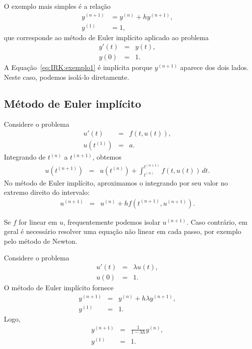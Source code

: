 O exemplo mais simples é a relação
\begin{equation}\label{eq:IRK:exemplo1}
  \begin{split}
    y^{(n+1)}&=y^{(n)}+h y^{(n+1)},\\
    y^{(1)}&=1,
  \end{split}
\end{equation}
que corresponde ao método de Euler implícito aplicado ao problema
\begin{eqnarray}
 y'(t)&=&y(t),\\
 y(0)&=&1.
\end{eqnarray}
A Equação~\eqref{eq:IRK:exemplo1} é implícita porque $y^{(n+1)}$ aparece dos dois lados. Neste caso, podemos isolá-lo diretamente.

\subsection{Método de Euler implícito}\label{sec:euler_imp}
Considere o problema
\begin{eqnarray}
  u'(t)  &=& f(t,u(t)),\\
  u(t^{(1)}) &=& a.
\end{eqnarray}
Integrando de $t^{(n)}$ a $t^{(n+1)}$, obtemos
\begin{eqnarray}
u(t^{(n+1)})&=&u(t^{(n)})+\int_{t^{(n)}}^{t^{(n+1)}}f(t,u(t))\,dt.
\end{eqnarray}
No método de Euler implícito, aproximamos o integrando por seu valor no extremo direito do intervalo:
\begin{eqnarray}
u^{(n+1)}&=&u^{(n)}+h f(t^{(n+1)},u^{(n+1)}).
\end{eqnarray}

Se $f$ for linear em $u$, frequentemente podemos isolar $u^{(n+1)}$. Caso contrário, em geral é necessário resolver uma equação não linear em cada passo, por exemplo pelo método de Newton.

\begin{ex}
Considere o problema
\begin{eqnarray}
u'(t)&=&\lambda u(t),\\
u(0)&=&1.
\end{eqnarray}
O método de Euler implícito fornece
\begin{eqnarray}
 y^{(n+1)}&=&y^{(n)}+h\lambda y^{(n+1)},\\
 y^{(1)}&=&1.
\end{eqnarray}
Logo,
\begin{eqnarray}
 y^{(n+1)}&=&\frac{1}{1-\lambda h}y^{(n)},\\
 y^{(1)}&=&1.
\end{eqnarray}
\end{ex}

